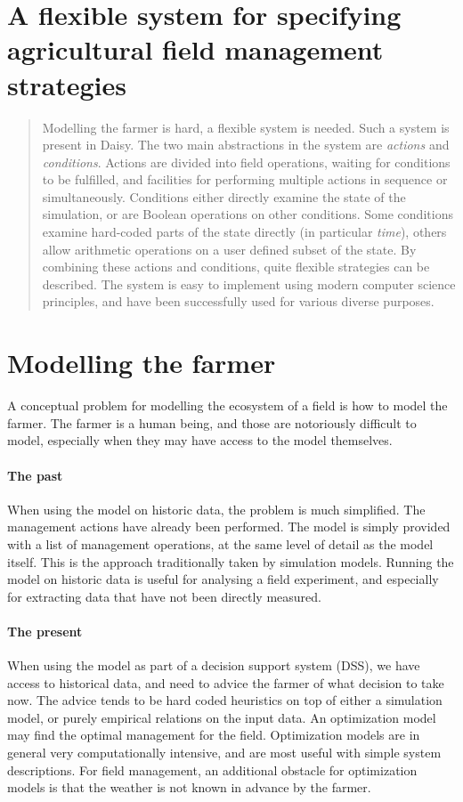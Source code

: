 \documentclass[a4paper]{article}
\begin{document}
\section*{A flexible system for specifying agricultural field management strategies}

\begin{abstract}
  Modelling the farmer is hard, a flexible system is needed.  Such a
  system is present in Daisy.  The two main abstractions in the system
  are \emph{actions} and \emph{conditions}. Actions are divided into
  field operations, waiting for conditions to be fulfilled, and
  facilities for performing multiple actions in sequence or
  simultaneously.  Conditions either directly examine the state of the
  simulation, or are Boolean operations on other conditions.  Some
  conditions examine hard-coded parts of the state directly (in
  particular \emph{time}), others allow arithmetic operations on a
  user defined subset of the state.  By combining these actions and
  conditions, quite flexible strategies can be described.  The system
  is easy to implement using modern computer science principles, and
  have been successfully used for various diverse purposes.
\end{abstract}


\section{Modelling the farmer}

A conceptual problem for modelling the ecosystem of a field is how to
model the farmer.  The farmer is a human being, and those are
notoriously difficult to model, especially when they may have access
to the model themselves.

\paragraph{The past} When using the model on historic data, the
problem is much simplified.  The management actions have already been
performed.  The model is simply provided with a list of management
operations, at the same level of detail as the model itself.  This is
the approach traditionally taken by simulation models.  Running the
model on historic data is useful for analysing a field experiment, and
especially for extracting data that have not been directly measured.

\paragraph{The present} When using the model as part of a decision
support system (DSS), we have access to historical data, and need to
advice the farmer of what decision to take now.  The advice tends to
be hard coded heuristics on top of either a simulation model, or
purely empirical relations on the input data.  An optimization model
may find the optimal management for the field.  Optimization models
are in general very computationally intensive, and are most useful
with simple system descriptions.  For field management, an additional
obstacle for optimization models is that the weather is not known in
advance by the farmer.
\end{document}
